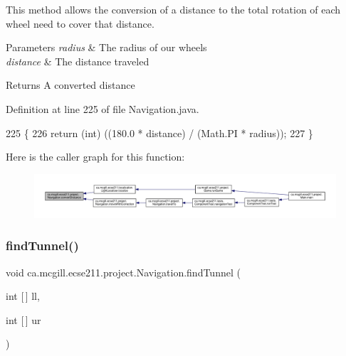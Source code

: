 This method allows the conversion of a distance to the total rotation of each wheel need to cover that distance.


\begin{DoxyParams}{Parameters}
{\em radius} & The radius of our wheels \\
\hline
{\em distance} & The distance traveled \\
\hline
\end{DoxyParams}
\begin{DoxyReturn}{Returns}
A converted distance 
\end{DoxyReturn}


Definition at line 225 of file Navigation.\+java.


\begin{DoxyCode}
225                                                                     \{
226     \textcolor{keywordflow}{return} (\textcolor{keywordtype}{int}) ((180.0 * distance) / (Math.PI * radius));
227   \}
\end{DoxyCode}
Here is the caller graph for this function\+:
\nopagebreak
\begin{figure}[H]
\begin{center}
\leavevmode
\includegraphics[width=350pt]{classca_1_1mcgill_1_1ecse211_1_1project_1_1_navigation_ac9e260bcd619ffa4820d7d0de7ea1c12_icgraph}
\end{center}
\end{figure}
\mbox{\label{classca_1_1mcgill_1_1ecse211_1_1project_1_1_navigation_ae0588f4dbf493a982171b8e7814bff37}} 
\subsubsection{\texorpdfstring{find\+Tunnel()}{findTunnel()}}
{\footnotesize\ttfamily void ca.\+mcgill.\+ecse211.\+project.\+Navigation.\+find\+Tunnel (\begin{DoxyParamCaption}\item[{int \mbox{[}$\,$\mbox{]}}]{ll,  }\item[{int \mbox{[}$\,$\mbox{]}}]{ur }\end{DoxyParamCaption})}

